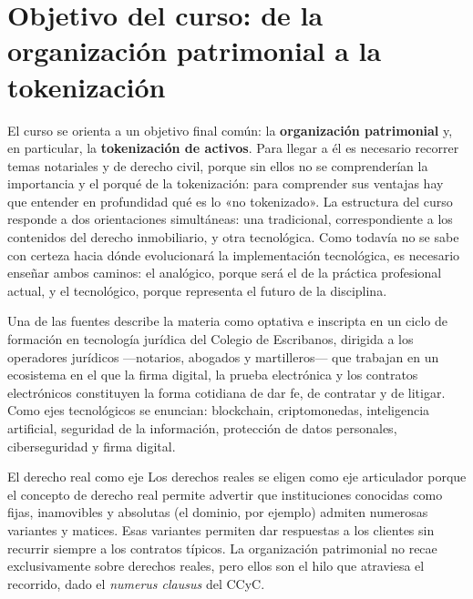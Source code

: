\documentclass[12pt,oneside]{book}
\begin{document}
\section{Objetivo del curso: de la organización patrimonial a la tokenización}

El curso se orienta a un objetivo final común: la \textbf{organización patrimonial} y, en particular, la \textbf{tokenización de activos}. Para llegar a él es necesario recorrer temas notariales y de derecho civil, porque sin ellos no se comprenderían la importancia y el porqué de la tokenización: para comprender sus ventajas hay que entender en profundidad qué es lo «no tokenizado». La estructura del curso responde a dos orientaciones simultáneas: una tradicional, correspondiente a los contenidos del derecho inmobiliario, y otra tecnológica. Como todavía no se sabe con certeza hacia dónde evolucionará la implementación tecnológica, es necesario enseñar ambos caminos: el analógico, porque será el de la práctica profesional actual, y el tecnológico, porque representa el futuro de la disciplina.

Una de las fuentes describe la materia como optativa e inscripta en un ciclo de formación en tecnología jurídica del Colegio de Escribanos, dirigida a los operadores jurídicos ---notarios, abogados y martilleros--- que trabajan en un ecosistema en el que la firma digital, la prueba electrónica y los contratos electrónicos constituyen la forma cotidiana de dar fe, de contratar y de litigar. Como ejes tecnológicos se enuncian: blockchain, criptomonedas, inteligencia artificial, seguridad de la información, protección de datos personales, ciberseguridad y firma digital.

\begin{concept}{El derecho real como eje}
Los derechos reales se eligen como eje articulador porque el concepto de derecho real permite advertir que instituciones conocidas como fijas, inamovibles y absolutas (el dominio, por ejemplo) admiten numerosas variantes y matices. Esas variantes permiten dar respuestas a los clientes sin recurrir siempre a los contratos típicos. La organización patrimonial no recae exclusivamente sobre derechos reales, pero ellos son el hilo que atraviesa el recorrido, dado el \emph{numerus clausus} del CCyC.
\end{concept}
\end{document}
